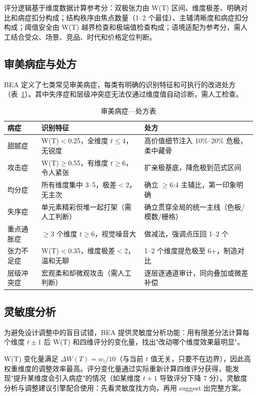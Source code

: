 \documentclass[10pt,a4paper]{article}
\begin{document}
评分逻辑基于维度数据计算参考分：双极张力由 W(T) 区间、维度极差、明确对比和病症扣分构成；结构秩序由焦点数量（1--2 个最佳）、主辅清晰度和病症扣分构成；阈值安全由 W(T) 越界检查和极端值检查构成；语境适配为参考分，需人工结合受众、场景、竞品、时代和价格定位判断。

\subsection{审美病症与处方}

BEA 定义了七类常见审美病症，每类有明确的识别特征和可执行的改进处方（表~\ref{tab:diseases}）。其中失序症和层级冲突症无法仅通过维度值自动诊断，需人工检查。

\begin{table}[H]
\centering
\caption{审美病症—处方表}
\label{tab:diseases}
\begin{tabular}{p{2cm}p{4.5cm}p{5cm}}
\toprule
\textbf{病症} & \textbf{识别特征} & \textbf{处方} \\
\midrule
甜腻症 & W(T)$<$0.25，全维度 $t\leq4$，无锐度 & 高价值细节注入 10\%--20\% 危极，柔中藏骨 \\
攻击症 & W(T)$\geq$0.55，有维度 $t\geq6$，令人紧张 & 扩亲极基底，降危极到范式区间 \\
均分症 & 所有维度集中 3--5，极差$<$2，无主次 & 确立 $\geq$6:4 主辅比，第一印象明确 \\
失序症 & 单元素精彩但堆一起打架（需人工判断） & 确立贯穿全局的统一主线（色板/模数/栅格） \\
重点通胀症 & $\geq$3 个维度 $t\geq6$，视觉噪音大 & 做减法，强调点压回 1--2 个 \\
张力不足症 & W(T)$<$0.35，维度极差$<$2，温和无聊 & 1--2 个维度提危极至 6+，制造对比 \\
层级冲突症 & 宏观柔和却微观攻击（需人工判断） & 逐层逐通道审计，同向叠加或微差补偿 \\
\bottomrule
\end{tabular}
\end{table}

\subsection{灵敏度分析}

为避免设计调整中的盲目试错，BEA 提供灵敏度分析功能：用有限差分法计算每个维度 $t\pm1$ 后 W(T) 和四维评分的变化量，找出"改动哪个维度效果最明显"。

W(T) 变化量满足 $\Delta W(T) = w_i/10$（与当前 $t$ 值无关，只要不在边界），因此高权重维度的调整效率最高。评分变化量通过实际重新计算四维评分获得，能发现"提升某维度会引入病症"的情况（如某维度 $t+1$ 导致评分下降 7 分）。灵敏度分析与调整建议引擎配合使用：先看灵敏度找方向，再用 suggest 出完整方案。
\end{document}
